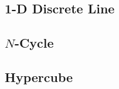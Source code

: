 \subsection{1-D Discrete Line}
\lipsum[1]
\subsection{$N$-Cycle}
\lipsum[1]
\subsection{Hypercube}
\lipsum[1]
